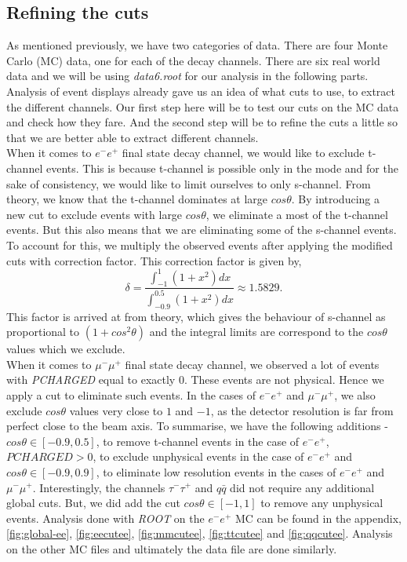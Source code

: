 \subsection{Refining the cuts}
As mentioned previously, we have two categories of data. There are four Monte Carlo (MC) data, one for each of the decay channels. There are six real world data and we will be using \textit{data6.root} for our analysis in the following parts. Analysis of event displays already gave us an idea of what cuts to use, to extract the different channels. Our first step here will be to test our cuts on the MC data and check how they fare. And the second step will be to refine the cuts a little so that we are better able to extract different channels.\\
When it comes to $e^-e^+$ final state decay channel, we would like to exclude t-channel events. This is because t-channel is possible only in the mode and for the sake of consistency, we would like to limit ourselves to only s-channel. From theory\cite{UB}, we know that the t-channel dominates at large $cos\theta$. By introducing a new cut to exclude events with large $cos\theta$, we eliminate a most of the t-channel events. But this also means that we are eliminating some of the s-channel events. To account for this, we multiply the observed events after applying the modified cuts with correction factor. This correction factor is given by,
\begin{equation}
    \delta = \frac{\int_{-1}^1 (1 + x^2) dx}{\int_{-0.9}^{0.5} (1 + x^2) dx} \approx 1.5829.
\end{equation}
This factor is arrived at from theory, which gives the behaviour of s-channel as proportional to $(1 + cos^2\theta)$ and the integral limits are correspond to the $cos\theta$ values which we exclude.\\
When it comes to $\mu^-\mu^+$ final state decay channel, we observed a lot of events with \textit{PCHARGED} equal to exactly $0$. These events are not physical. Hence we apply a cut to eliminate such events. In the cases of $e^-e^+$ and $\mu^-\mu^+$, we also exclude $cos\theta$ values very close to $1$ and $-1$, as the detector resolution is far from perfect close to the beam axis. To summarise, we have the following additions - $cos\theta \in [-0.9, 0.5]$, to remove t-channel events in the case of $e^-e^+$, $PCHARGED > 0$, to exclude unphysical events in the case of $e^-e^+$ and $cos\theta \in [-0.9, 0.9]$, to eliminate low resolution events in the cases of $e^-e^+$ and $\mu^-\mu^+$. Interestingly, the channels $\tau^-\tau^+$ and $q\bar{q}$ did not require any additional global cuts. But, we did add the cut $cos\theta \in [-1, 1]$ to remove any unphysical events. Analysis done with \textit{ROOT} on the $e^-e^+$ MC can be found in the appendix, \ref{fig:global-ee}, \ref{fig:eecutee}, \ref{fig:mmcutee}, \ref{fig:ttcutee} and \ref{fig:qqcutee}. Analysis on the other MC files and ultimately the data file are done similarly.\\
